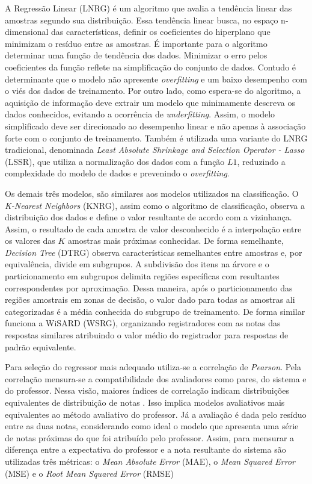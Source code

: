 A Regressão Linear (LNRG) é um algoritmo que avalia a tendência linear das amostras segundo sua distribuição. Essa tendência linear busca, no espaço n-dimensional das características, definir os coeficientes do hiperplano que minimizam o resíduo entre as amostras. É importante para o algoritmo determinar uma função de tendência dos dados. Minimizar o erro pelos coeficientes da função reflete na simplificação do conjunto de dados. Contudo é determinante que o modelo não apresente \textit{overfitting} e um baixo desempenho com o viés dos dados de treinamento. Por outro lado, como espera-se do algoritmo, a aquisição de informação deve extrair um modelo que minimamente descreva os dados conhecidos, evitando a ocorrência de \textit{underfitting}. Assim, o modelo simplificado deve ser direcionado ao desempenho linear e não apenas à associação forte com o conjunto de treinamento. Também é utilizada uma variante do LNRG tradicional, denominada \textit{Least Absolute Shrinkage and Selection Operator - Lasso} (LSSR), que utiliza a normalização dos dados com a função $ L1 $, reduzindo a complexidade do modelo de dados e prevenindo o \textit{overfitting}.

Os demais três modelos, são similares aos modelos utilizados na classificação. O \textit{K-Nearest Neighbors} (KNRG), assim como o algoritmo de classificação, observa a distribuição dos dados e define o valor resultante de acordo com a vizinhança. Assim, o resultado de cada amostra de valor desconhecido é a interpolação entre os valores das $ K $ amostras mais próximas conhecidas. De forma semelhante, \textit{Decision Tree} (DTRG) observa características semelhantes entre amostras e, por equivalência, divide em subgrupos. A subdivisão dos itens na árvore e o particionamento em subgrupos delimita regiões específicas com resultantes correspondentes por aproximação. Dessa maneira, após o particionamento das regiões amostrais em zonas de decisão, o valor dado para todas as amostras ali categorizadas é a média conhecida do subgrupo de treinamento. De forma similar funciona a WiSARD (WSRG), organizando registradores com as notas das respostas similares atribuindo o valor médio do registrador para respostas de padrão equivalente.

Para seleção do regressor mais adequado utiliza-se a correlação de \textit{Pearson}. Pela correlação mensura-se a compatibilidade dos avaliadores como pares, do sistema e do professor. Nessa visão, maiores índices de correlação indicam distribuições equivalentes de distribuição de notas \cite{morettin2010}. Isso implica modelos avaliativos mais equivalentes ao método avaliativo do professor. Já a avaliação é dada pelo resíduo entre as duas notas, considerando como ideal o modelo que apresenta uma série de notas próximas do que foi atribuído pelo professor. Assim, para mensurar a diferença entre a expectativa do professor e a nota resultante do sistema são utilizadas três métricas: o \textit{Mean Absolute Error} (MAE), o \textit{Mean Squared Error} (MSE) e o \textit{Root Mean Squared Error} (RMSE)

